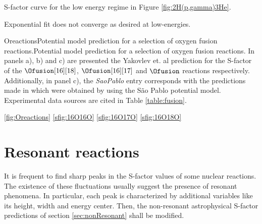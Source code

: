 \documentclass[openany]{book}
\begin{document}
S-factor curve for the low energy regime in Figure \ref{fig:2H(p,gamma)3He}.

Exponential fit does not converge as desired at low-energies.






{Oreactions}{Potential model prediction for a selection of oxygen fusion reactions.}{Potential model prediction for a selection of oxygen fusion reactions. In panels a), b) and c) are presented the  Yakovlev et. al prediction for the S-factor of the $\Ofusion[16][18]$, $\Ofusion[16][17]$ and $\Ofusion$ reactions respectively. Additionally, in panel c), the \textit{SaoPablo} entry corresponds with the predictions made in \cite{yakovlev_beard_gasques_wiescher_2010} which were obtained by using the São Pablo potential model. Experimental data sources are cited in Table \ref{table:fusion}.}


\ref{fig:Oreactions} 
\ref{sfig:16O16O} 
\ref{sfig:16O17O} 
\ref{sfig:16O18O} 


\section{Resonant reactions} \label{sec:resonant}

It is frequent to find sharp peaks in the S-factor values of some nuclear reactions. The existence of these fluctuations usually suggest the presence of  resonant phenomena. In particular, each peak is characterized by additional variables like its height, width and energy center. Then, the non-resonant astrophysical S-factor predictions of section \ref{sec:nonResonant} shall be modified.
\end{document}
